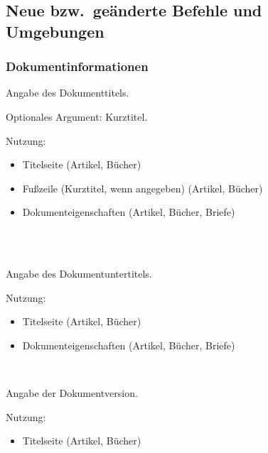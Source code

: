 \subsection{Neue bzw.\ geänderte Befehle und Umgebungen}

\subsubsection{Dokumentinformationen}

\DescribeMacro{\title}
Angabe des Dokumenttitels.

Optionales Argument: Kurztitel.

Nutzung:
\begin{itemize}
	\item Titelseite (Artikel, Bücher)
	\item Fußzeile (Kurztitel, wenn angegeben) (Artikel, Bücher)
	\item Dokumenteigenschaften (Artikel, Bücher, Briefe)
\end{itemize}

\begin{nutzung}
		\>\\
	\beispiel
		\>\\
		\>
\end{nutzung}

\DescribeMacro{\subtitle}
Angabe des Dokumentuntertitels.

Nutzung:
\begin{itemize}
	\item Titelseite (Artikel, Bücher)
	\item Dokumenteigenschaften (Artikel, Bücher, Briefe)
\end{itemize}

\begin{nutzung}
		\>\\
	\beispiel
		\>
\end{nutzung}

\DescribeMacro{\version}
Angabe der Dokumentversion.

Nutzung:
\begin{itemize}
	\item Titelseite (Artikel, Bücher)
\end{itemize}

\begin{nutzung}
		\>\\
	\beispiel
		\>
\end{nutzung}

